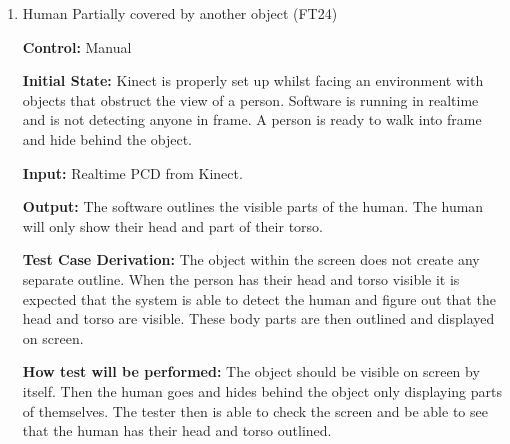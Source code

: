 \documentclass[12pt, titlepage]{article}
\begin{document}
\begin{enumerate}
  \item{Human Partially covered by another object (FT24)\\}

  \textbf{Control:} Manual

  \textbf{Initial State:} Kinect is properly set up whilst facing an environment with objects that obstruct the view of a person. Software is running in realtime and is not detecting anyone in frame. A person is ready to walk into frame and hide behind the object.

  \textbf{Input:} Realtime PCD from Kinect.

  \textbf{Output:} The software outlines the visible parts of the human. The human will only show their head and part of their torso.

  \textbf{Test Case Derivation:} The object within the screen does not create any separate outline. When the person has their head and torso visible it is expected that the system is able to detect the human and figure out that the head and torso are visible. These body parts are then outlined and displayed on screen.

  \textbf{How test will be performed:} The object should be visible on screen by itself. Then the human goes and hides behind the object only displaying parts of themselves. The tester then is able to check the screen and be able to see that the human has their head and torso outlined.
  
\end{enumerate}
\end{document}
